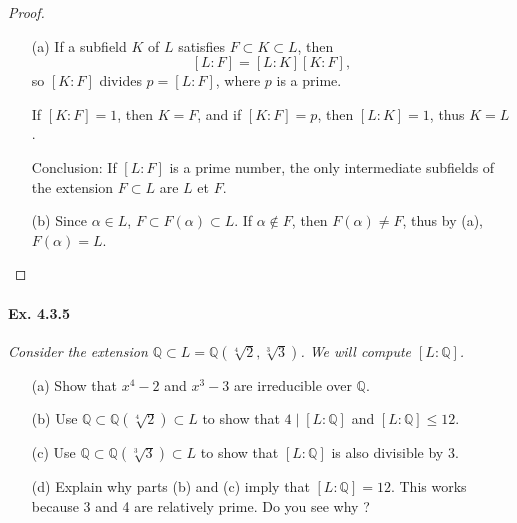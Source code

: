 \documentclass[11pt,a4paper]{article}
\newcommand{\Q}{\mathbb{Q}}
\begin{document}
\begin{proof}
\begin{enumerate}
\item[(a)]
If a subfield  $K$ of $L$ satisfies  $F \subset K \subset L$, then
$$[L:F] = [L:K][K:F],$$ 
so $[K:F]$ divides $p = [L:F]$, where $p$ is a prime.

If $[K:F] = 1$, then $K = F$, and if $[K:F]=p$, then $[L:K]= 1$, thus $K = L$.

Conclusion: If  $[L:F]$ is a prime number, the only intermediate subfields of the extension $F \subset L$  are $L$ et $F$.


\item[(b)] Since $\alpha \in L$, $F \subset F(\alpha) \subset L$.
If $\alpha \not \in F$, then $F(\alpha) \neq F$, thus by (a), $F(\alpha) = L$.

\end{enumerate}
\end{proof}

\paragraph{Ex. 4.3.5}

{\it Consider the extension $\Q \subset L = \Q(\sqrt[4]{2},\sqrt[3]{3})$. We will compute $[L:\Q]$.
\begin{enumerate}
\item[(a)] Show that $x^4 - 2$ and $x^3 - 3$ are irreducible over $\Q$.
\item[(b)] Use $\Q \subset \Q(\sqrt[4]{2}) \subset L$ to show that $4 \mid [L:\Q]$ and $[L:\Q] \leq 12$.
\item[(c)] Use $\Q \subset \Q(\sqrt[3]{3}) \subset L$ to show that $[L : \Q]$ is also divisible by 3.
\item[(d)] Explain why parts (b) and (c) imply that $[L:\Q] = 12$. This works because 3 and 4 are relatively prime. Do you see why ?
\end{enumerate}
}
\end{document}

